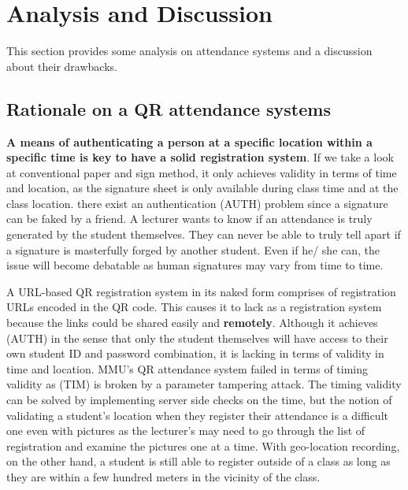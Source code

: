 \documentclass[runningheads]{llncs}
\begin{document}
\section{Analysis and Discussion}
This section provides some analysis on attendance systems and a discussion about their drawbacks.

\subsection{Rationale on a QR attendance systems}
\textbf{A means of authenticating a person at a specific location within a specific time is key to have a solid registration system}. If we take a look at conventional paper and sign method, it only achieves validity in terms of time and location, as the signature sheet is only available during class time and at the class location. there exist an authentication (AUTH) problem since a signature can be faked by a friend. A lecturer wants to know if an attendance is truly generated by the student themselves. They can never be able to truly tell apart if a signature is masterfully forged by another student. Even if he/ she can, the issue will become debatable as human signatures may vary from time to time. 

A URL-based QR registration system in its naked form comprises of registration URLs encoded in the QR code. This causes it to lack as a registration system because the links could be shared easily and \textbf{remotely}. Although it achieves (AUTH) in the sense that only the student themselves will have access to their own student ID and password combination, it is lacking in terms of validity in time and location. MMU's QR attendance system failed in terms of timing validity as (TIM) is broken by a parameter tampering attack. The timing validity can be solved by implementing server side checks on the time, but the notion of validating a student's location when they register their attendance is a difficult one even with pictures as the lecturer's may need to go through the list of registration and examine the pictures one at a time. With geo-location recording, on the other hand, a student is still able to register outside of a class as long as they are within a few hundred meters in the vicinity of the class.
\end{document}
